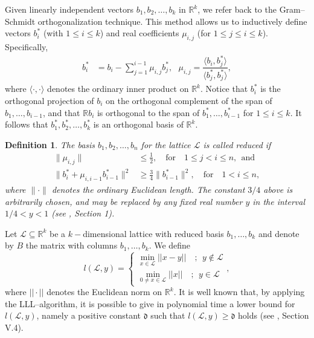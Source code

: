 \documentclass[11pt,a4paper]{article}
\newtheorem{definition}[theorem]{Definition}
\numberwithin{equation}{section}
\numberwithin{table}{section}
\numberwithin{figure}{section}
\begin{document}
Given linearly independent vectors $b_1, b_2, \ldots, b_k $ in $ \mathbb{R}^k$, we refer back to the Gram--Schmidt orthogonalization technique. This method allows us to inductively define vectors $b^*_i$ (with $1 \leq i \leq k$) and real coefficients $\mu_{i,j}$ (for $1 \leq j \leq i \leq k$). Specifically,
\begin{align*}
	b^*_i &= b_i - \sum_{j=1}^{i-1} \mu_{i,j} b^*_j,~~~
	\mu_{i,j} = \dfrac{\langle b_i, b^*_j\rangle }{\langle b^*_j, b^*_j\rangle},
\end{align*}
where \( \langle \cdot , \cdot \rangle \)  denotes the ordinary inner product on \( \mathbb{R}^k \). Notice that \( b^*_i \) is the orthogonal projection of \( b_i \) on the orthogonal complement of the span of \( b_1, \ldots, b_{i-1} \), and that \( \mathbb{R}b_i \) is orthogonal to the span of \( b^*_1, \ldots, b^*_{i-1} \) for \( 1 \leq i \leq k \). It follows that \( b^*_1, b^*_2, \ldots, b^*_k \) is an orthogonal basis of \( \mathbb{R}^k \). 
\begin{definition}
	The basis $b_1, b_2, \ldots, b_n$ for the lattice $\mathcal{L}$ is called reduced if
	\begin{align*}
		\| \mu_{i,j} \| &\leq \frac{1}{2}, \quad \text{for} \quad 1 \leq j < i \leq n,~~
		\text{and}\\
		\|b^*_{i}+\mu_{i,i-1} b^*_{i-1}\|^2 &\geq \frac{3}{4}\|b^*_{i-1}\|^2, \quad \text{for} \quad 1 < i \leq n,
	\end{align*}
	where $ \| \cdot \| $ denotes the ordinary Euclidean length. The constant $ {3}/{4}$ above is arbitrarily chosen, and may be replaced by any fixed real number $ y $ in the interval ${1}/{4} < y < 1$ {\rm(see \cite{LLL}, Section 1)}.
\end{definition}
Let $\mathcal{L}\subseteq\mathbb{R}^k$ be a $k-$dimensional lattice  with reduced basis $b_1,\ldots,b_k$ and denote by $B$ the matrix with columns $b_1,\ldots,b_k$. 
We define
\[
l\left( \mathcal{L},y\right)= \left\{ \begin{array}{c}
	\min_{x\in \mathcal{L}}||x-y|| \quad  ;~~ y\not\in \mathcal{L}\\
	\min_{0\ne x\in \mathcal{L}}||x|| \quad  ;~~ y\in \mathcal{L}
\end{array}
\right.,
\]
where $||\cdot||$ denotes the Euclidean norm on $\mathbb{R}^k$. It is well known that, by applying the
LLL--algorithm, it is possible to give in polynomial time a lower bound for $l\left( \mathcal{L},y\right)$, namely a positive constant $\mathfrak{d}$ such that $l\left(\mathcal{L},y\right)\ge \mathfrak{d}$ holds (see \cite{SMA}, Section V.4).
\end{document}
